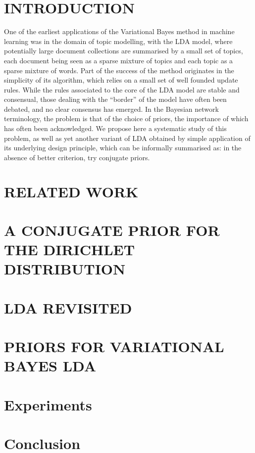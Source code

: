 \documentclass[twoside]{article}
\begin{document}
\section{INTRODUCTION}
One of the earliest applications of the Variational Bayes method in machine learning was in the domain of topic modelling, with the LDA model, where potentially large document collections are summarised by a small set of topics, each document being seen as a sparse mixture of topics and each topic as a sparse mixture of words. Part of the success of the method originates in the simplicity of its algorithm, which relies on a small set of well founded update rules. While the rules associated to the core of the LDA model are stable and consensual, those dealing with the ``border'' of the model have often been debated, and no clear consensus has emerged. In the Bayesian network terminology, the problem is that of the choice of priors, the importance of which has often been acknowledged. We propose here a systematic study of this problem, as well as yet another variant of LDA obtained by simple application of its underlying design principle, which can be informally summarised as: in the absence of better criterion, try conjugate priors.
\section{RELATED WORK}

\section{A CONJUGATE PRIOR FOR THE DIRICHLET DISTRIBUTION}
\label{sec:huntingsnark}

\section{LDA REVISITED}
\label{sec:ldarevisited}

\section{PRIORS FOR VARIATIONAL BAYES LDA}
\label{sec:ldawithcprior}

\section{Experiments}

\section{Conclusion}




\pagebreak %



\end{document}

